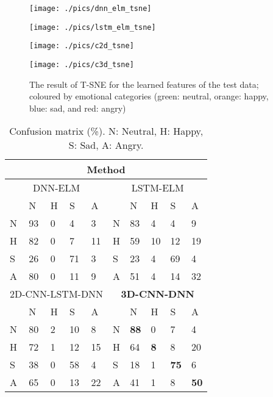 \documentclass[conference, compsoc, twoside]{IEEEtran}
\begin{document}
\begin{figure}[!th]
\begin{minipage}[b]{0.48\linewidth}
  \centerline{\texttt{[image: ./pics/dnn\_elm\_tsne]}}
\end{minipage}
\begin{minipage}[b]{0.48\linewidth}
  \centerline{\texttt{[image: ./pics/lstm\_elm\_tsne]}}
\end{minipage}
\begin{minipage}[b]{0.48\linewidth}
  \centerline{\texttt{[image: ./pics/c2d\_tsne]}}
\end{minipage}
\begin{minipage}[b]{0.48\linewidth}
  \centerline{\texttt{[image: ./pics/c3d\_tsne]}}
\end{minipage}
\caption{The result of T-SNE for the learned features of the test data; coloured by emotional categories (green: neutral, orange: happy, blue: sad, and red: angry)}
\label{fig:tsne}
\end{figure}


\begin{table}[!th]
\centering
\begin{tabular}{llllllllll}
\hline
\multicolumn{10}{c}{Method} \\
\hline
\multicolumn{5}{c}{DNN-ELM} & \multicolumn{5}{c}{LSTM-ELM}\\
\hline
  & N & H & S & A    &   & N  & H & S & A\\
\hline
N & 93 &  0 & 4 & 3     & N & 83 &  4 & 4 & 9 \\
H & 82 &  0 & 7 & 11    & H & 59 &  10 &12 &  19 \\
S & 26 &  0 & 71 & 3    & S & 23 &  4 & 69 &  4 \\
A & 80 &  0 & 11 & 9    & A & 51 &  4 & 14 &  32 \\
\hline
\hline
\multicolumn{5}{c}{2D-CNN-LSTM-DNN} & \multicolumn{5}{c}{\textbf{3D-CNN-DNN}}\\
\hline
  & N & H & S & A    &   & N  & H & S & A\\ 
\hline
N & 80 & 2 & 10 & 8  & N & \textbf{88} &  0 & 7 & 4 \\
H & 72 & 1 & 12 & 15 & H & 64 & \textbf{8} &  8 & 20 \\
S & 38 & 0 & 58 & 4  & S & 18 & 1 & \textbf{75} & 6 \\
A & 65 & 0 & 13 & 22 & A & 41 & 1 & 8 & \textbf{50} \\
\hline
\end{tabular}
\vspace{0.15cm}
\caption{Confusion matrix (\%). N: Neutral, H: Happy, S: Sad, A: Angry.}\label{tab:cm}
\end{table}
\end{document}
